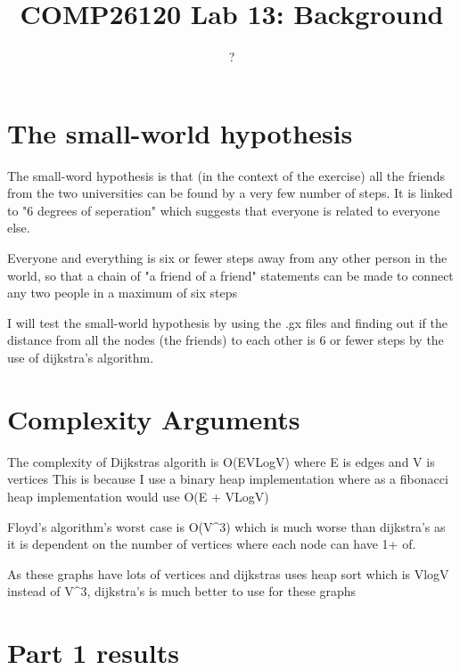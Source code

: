 \documentclass{article}
\title{COMP26120 Lab 13: Background}
\author{?}
\begin{document}
\maketitle


\section{The small-world hypothesis}
\label{sec:small world}

The small-word hypothesis is that (in the context of the exercise) all the friends
from the two universities can be found by a very few number of steps.
It is linked to "6 degrees of seperation" which suggests that everyone is related 
to everyone else.

Everyone and everything is six or fewer steps away
from any other person in the world, so that a chain of 
"a friend of a friend" statements can be made to connect any two people 
in a maximum of six steps

I will test the small-world hypothesis by using the .gx files and finding out if
the distance from all the nodes (the friends) to each other is 6 or fewer steps by the use
of dijkstra's algorithm. 


\section{Complexity Arguments}
\label{sec:complexity}

The complexity of Dijkstras algorith is O(EVLogV) where E is edges and V is vertices
This is because I use a binary heap implementation where as a fibonacci heap implementation
would use O(E + VLogV)

Floyd's algorithm's worst case is O(V^3) which is much worse than dijkstra's as 
it is dependent on the number of vertices where each node can have 1+ of.

As these graphs have lots of vertices and dijkstras uses heap sort which is VlogV instead of V^3,
dijkstra's is much better to use for these graphs


\section{Part 1 results}
\label{sec:part1}
\end{document}
